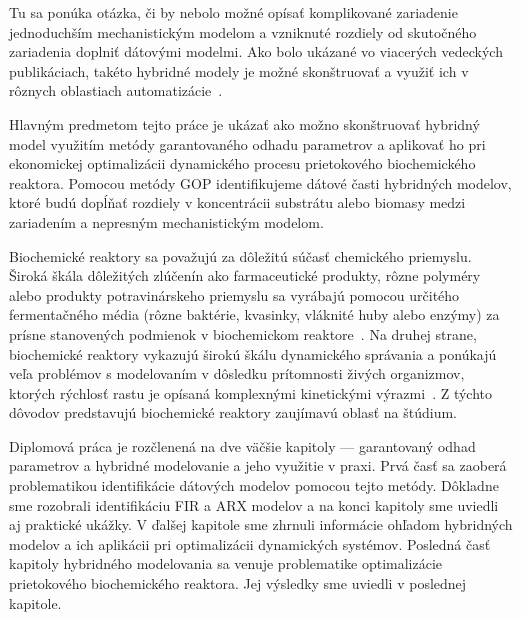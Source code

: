 Tu sa ponúka otázka, či by nebolo možné opísať komplikované zariadenie jednoduchším mechanistickým modelom a vzniknuté rozdiely od skutočného zariadenia doplniť dátovými modelmi. Ako bolo ukázané vo viacerých vedeckých publikáciach, takéto hybridné modely je možné skonštruovať a využiť ich v rôznych oblastiach automatizácie~\cite{hamilton:hybrid_modeling:2017, hernandez:economics_opt_w_mismatch:2019}.

Hlavným predmetom tejto práce je ukázať ako možno skonštruovať hybridný model využitím metódy garantovaného odhadu parametrov a aplikovať ho pri ekonomickej optimalizácii dynamického procesu prietokového biochemického reaktora. Pomocou metódy GOP identifikujeme dátové časti hybridných modelov, ktoré budú dopĺňať rozdiely v koncentrácii substrátu alebo biomasy medzi zariadením a nepresným mechanistickým modelom.

Biochemické reaktory sa považujú za dôležitú súčasť chemického priemyslu. Široká škála dôležitých zlúčenín ako farmaceutické produkty, rôzne polyméry alebo produkty potravinárskeho priemyslu sa vyrábajú pomocou určitého fermentačného média (rôzne baktérie, kvasinky, vláknité huby alebo enzýmy) za prísne stanovených podmienok v biochemickom reaktore~\cite{srinivasan:chemostat_opt:2003}. Na druhej strane, biochemické reaktory vykazujú širokú škálu dynamického správania a ponúkajú veľa problémov s modelovaním v dôsledku prítomnosti živých organizmov, ktorých rýchlosť rastu je opísaná komplexnými kinetickými výrazmi~\cite{psichogios:hybrid_process_model:1992}. Z týchto dôvodov predstavujú biochemické reaktory zaujímavú oblasť na štúdium.

Diplomová práca je rozčlenená na dve väčšie kapitoly --- garantovaný odhad parametrov a hybridné modelovanie a jeho využitie v praxi. Prvá časť sa zaoberá problematikou identifikácie dátových modelov pomocou tejto metódy. Dôkladne sme rozobrali identifikáciu FIR a ARX modelov a na konci kapitoly sme uviedli aj praktické ukážky. V ďalšej kapitole sme zhrnuli informácie ohľadom hybridných modelov a ich aplikácii pri optimalizácii dynamických systémov. Posledná časť kapitoly hybridného modelovania sa venuje problematike optimalizácie prietokového biochemického reaktora. Jej výsledky sme uviedli v poslednej kapitole.
